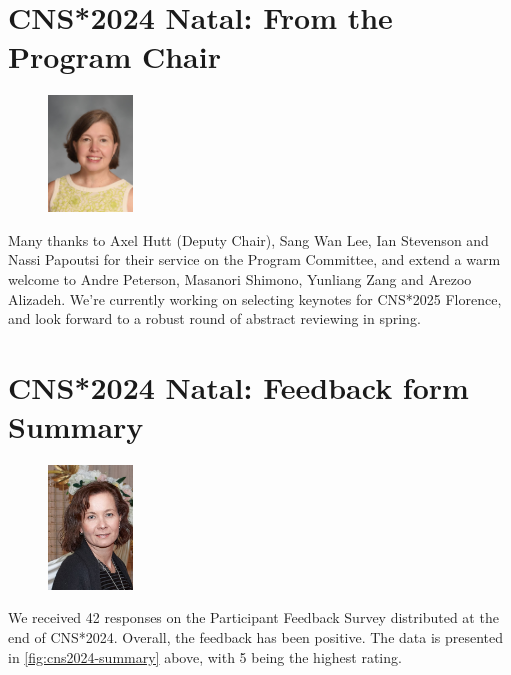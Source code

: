 \documentclass[11pt,a4paper,oneside]{article}
\begin{document}
\clearpage
\section*{CNS*2024 Natal: From the Program Chair}%
\begin{figure}
  \includegraphics[width=0.2\textwidth]{images/Haas}
\end{figure}

Many thanks to Axel Hutt (Deputy Chair), Sang Wan Lee, Ian Stevenson and Nassi Papoutsi for their service on the Program Committee, and extend a warm welcome to Andre Peterson, Masanori Shimono, Yunliang Zang and Arezoo Alizadeh.
We're currently working on selecting keynotes for CNS*2025 Florence, and look forward to a robust round of abstract reviewing in spring.

\vspace{15ex}


\clearpage
\section*{CNS*2024 Natal: Feedback form Summary}%
\begin{figure}
  \includegraphics[width=0.2\textwidth]{images/Kameneva}
\end{figure}

We received 42 responses on the Participant Feedback Survey distributed at the end of CNS*2024.
Overall, the feedback has been positive. The data is presented in \cref{fig:cns2024-summary} above, with 5 being the highest rating.
\end{document}

